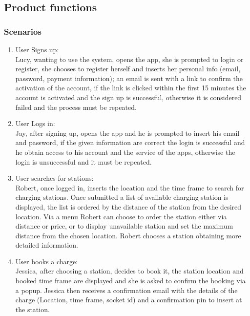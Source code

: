 \subsection{Product functions}

\subsubsection{Scenarios}
\begin{enumerate}[label=S\arabic*]
      \item User Signs up:\\
            Lucy, wanting to use the system, opens the app, she is prompted to login or register,
            she chooses to register herself and inserts her personal info (email, password, payment information);
            an email is sent with a link to confirm the activation of the account, if the link is clicked within
            the first 15 minutes the account is activated and the sign up is successful,
            otherwise it is considered failed and the process must be repeated.
      \item User Logs in:\\
            Jay, after signing up, opens the app and he is prompted to insert his email and password,
            if the given information are correct the login is successful and he obtain access to his account
            and the service of the apps, otherwise the login is unsuccessful and it must be repeated.
      \item User searches for stations:\\
            Robert, once logged in, inserts the location and the time frame to search for charging stations.
            Once submitted a list of available charging station is displayed, the list is ordered by the distance of the station
            from the desired location. Via a menu Robert can choose to order the station either via distance or price,
            or to display unavailable station and set the maximum distance from the chosen location.
            Robert chooses a station obtaining more detailed information.
      \item User books a charge:\\
            Jessica, after choosing a station, decides to book it, the station location and booked time frame are displayed
            and she is asked to confirm the booking via a popup. Jessica then receives a confirmation email with the details
            of the charge (Location, time frame, socket id) and a confirmation pin to insert at the station.

\end{enumerate}
